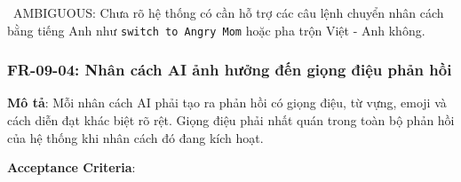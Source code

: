 \warningicon\  AMBIGUOUS: Chưa rõ hệ thống có cần hỗ trợ các câu lệnh chuyển nhân cách bằng tiếng Anh như \texttt{switch to Angry Mom} hoặc pha trộn Việt - Anh không.



\subsubsection{FR-09-04: Nhân cách AI ảnh hưởng đến giọng điệu phản hồi}

\textbf{Mô tả}: Mỗi nhân cách AI phải tạo ra phản hồi có giọng điệu, từ vựng, emoji và cách diễn đạt khác biệt rõ rệt. Giọng điệu phải nhất quán trong toàn bộ phản hồi của hệ thống khi nhân cách đó đang kích hoạt.



\textbf{Acceptance Criteria}:

